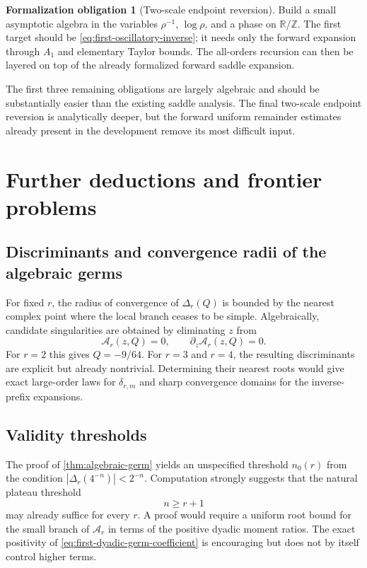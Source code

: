 \documentclass[11pt,oneside]{article}
\numberwithin{equation}{section}
\theoremstyle{definition}
\newtheorem{obligation}[theorem]{Formalization obligation}
\theoremstyle{remark}
\newcommand{\R}{\mathbb R}
\newcommand{\Z}{\mathbb Z}
\begin{document}
\begin{obligation}[Two-scale endpoint reversion]
Build a small asymptotic algebra in the variables $\rho^{-1}$, $\log\rho$, and a phase on
$\R/\Z$.  The first target should be \eqref{eq:first-oscillatory-inverse}; it needs only the
forward expansion through $A_1$ and elementary Taylor bounds.  The all-orders recursion can
then be layered on top of the already formalized forward saddle expansion.
\end{obligation}

The first three remaining obligations are largely algebraic and should be substantially easier
than the existing saddle analysis.  The final two-scale endpoint reversion is analytically
deeper, but the forward uniform remainder estimates already present in the development remove
its most difficult input.

\section{Further deductions and frontier problems}
\label{sec:frontier-problems}

\subsection{Discriminants and convergence radii of the algebraic germs}

For fixed $r$, the radius of convergence of $\Delta_r(Q)$ is bounded by the nearest complex
point where the local branch ceases to be simple.  Algebraically, candidate singularities are
obtained by eliminating $z$ from
\begin{equation}
 \mathcal A_r(z,Q)=0,
 \qquad
 \partial_z\mathcal A_r(z,Q)=0.
 \label{eq:discriminant-system}
\end{equation}
For $r=2$ this gives $Q=-9/64$.  For $r=3$ and $r=4$, the resulting discriminants are
explicit but already nontrivial.  Determining their nearest roots would give exact
large-order laws for $\delta_{r,m}$ and sharp convergence domains for the inverse-prefix
expansions.

\subsection{Validity thresholds}

The proof of \cref{thm:algebraic-germ} yields an unspecified threshold $n_0(r)$ from the
condition $|\Delta_r(4^{-n})|<2^{-n}$.  Computation strongly suggests that the natural
plateau threshold
\begin{equation}
 n\ge r+1
 \label{eq:natural-threshold-conjecture}
\end{equation}
may already suffice for every $r$.  A proof would require a uniform root bound for the small
branch of $\mathcal A_r$ in terms of the positive dyadic moment ratios.  The exact positivity
of \eqref{eq:first-dyadic-germ-coefficient} is encouraging but does not by itself control
higher terms.
\end{document}
